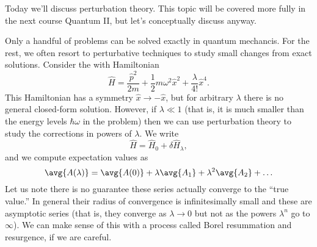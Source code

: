 Today we'll discuss perturbation theory. This topic will be covered more fully in the next course Quantum II, but let's conceptually discuss anyway.

Only a handful of problems can be solved exactly in quantum mechancis. For the rest, we often resort to perturbative techniques to study small changes from exact solutions.
Consider the  with Hamiltonian
\begin{equation}
    \hat H = \frac{\hat p^2}{2m} + \frac{1}{2} m\omega^2 \hat x^2 + \frac{\lambda}{4!}\hat x^4.
\end{equation}
This Hamiltonian has a symmetry $\hat x \to -\hat x$, but for arbitrary $\lambda$ there is no general closed-form solution. However, if $\lambda \ll 1$ (that is, it is much smaller than the energy levels $\hbar \omega$ in the problem) then we can use perturbation theory to study the corrections in powers of $\lambda$. We write
\begin{equation}
    \hat H = \hat H_0 + \delta \hat H_\lambda,
\end{equation}
and we compute expectation values as
\begin{equation}
    \avg{A(\lambda)} = \avg{A(0)}+ \lambda \avg{A_1} + \lambda^2 \avg{A_2} + \ldots
\end{equation}
Let us note there is no guarantee these series actually converge to the ``true value.'' In general their radius of convergence is infinitesimally small and these are asymptotic series (that is, they converge as $\lambda \to 0$ but not as the powers $\lambda^n$ go to $\infty$). We can make sense of this with a process called Borel resummation and resurgence, if we are careful.


